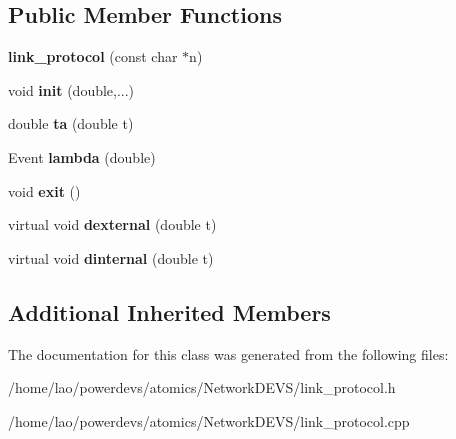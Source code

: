 \subsection*{Public Member Functions}
\begin{DoxyCompactItemize}
\item 
{\bfseries link\+\_\+protocol} (const char $\ast$n)\hypertarget{classlink__protocol_a29cc4e9d4a32ffaaebfcce0fe38af213}{}\label{classlink__protocol_a29cc4e9d4a32ffaaebfcce0fe38af213}

\item 
void {\bfseries init} (double,...)\hypertarget{classlink__protocol_a0d537bb129776e711f0523a2efc6540d}{}\label{classlink__protocol_a0d537bb129776e711f0523a2efc6540d}

\item 
double {\bfseries ta} (double t)\hypertarget{classlink__protocol_a0a9558cd1b752b9d01d98ae656b095e0}{}\label{classlink__protocol_a0a9558cd1b752b9d01d98ae656b095e0}

\item 
Event {\bfseries lambda} (double)\hypertarget{classlink__protocol_ad8e4ff0a5ac9c6057d105cacc43bab98}{}\label{classlink__protocol_ad8e4ff0a5ac9c6057d105cacc43bab98}

\item 
void {\bfseries exit} ()\hypertarget{classlink__protocol_a1439b43d737cccf1839915a46825bf35}{}\label{classlink__protocol_a1439b43d737cccf1839915a46825bf35}

\item 
virtual void {\bfseries dexternal} (double t)\hypertarget{classlink__protocol_a41b2cf20f21b9b5b7170f8f33fd56667}{}\label{classlink__protocol_a41b2cf20f21b9b5b7170f8f33fd56667}

\item 
virtual void {\bfseries dinternal} (double t)\hypertarget{classlink__protocol_abae9797f2bf160152cf43bd011742d22}{}\label{classlink__protocol_abae9797f2bf160152cf43bd011742d22}

\end{DoxyCompactItemize}
\subsection*{Additional Inherited Members}


The documentation for this class was generated from the following files\+:\begin{DoxyCompactItemize}
\item 
/home/lao/powerdevs/atomics/\+Network\+D\+E\+V\+S/link\+\_\+protocol.\+h\item 
/home/lao/powerdevs/atomics/\+Network\+D\+E\+V\+S/link\+\_\+protocol.\+cpp\end{DoxyCompactItemize}

